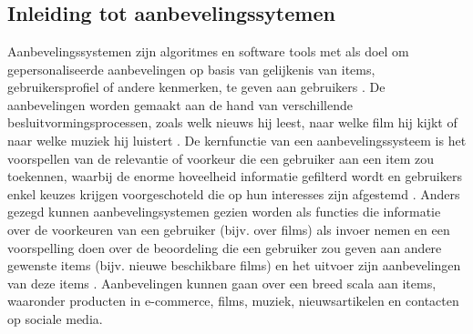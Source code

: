 \chapter{}%
\label{ch:stand-van-zaken}



\section{Inleiding tot aanbevelingssytemen}
Aanbevelingssystemen zijn algoritmes en software tools met als doel om gepersonaliseerde aanbevelingen op basis van gelijkenis van items, gebruikersprofiel of andere kenmerken, te geven aan gebruikers \autocite{Patel2020, Patel2023}. De aanbevelingen worden gemaakt aan de hand van verschillende besluitvormingsprocessen, zoals welk nieuws hij leest, naar welke film hij kijkt of naar welke muziek hij luistert \autocite{Patel2017}. De kernfunctie van een aanbevelingssysteem is het voorspellen van de relevantie of voorkeur die een gebruiker aan een item zou toekennen, waarbij de enorme hoveelheid informatie gefilterd wordt en gebruikers enkel keuzes krijgen voorgeschoteld die op hun interesses zijn afgestemd \autocite{Fkih2022}. Anders gezegd kunnen aanbevelingsystemen gezien worden als functies die informatie over de voorkeuren van een gebruiker (bijv. over films) als invoer nemen en een voorspelling doen over de beoordeling die een gebruiker zou geven aan andere gewenste items (bijv. nieuwe beschikbare films) en het uitvoer zijn aanbevelingen van deze items \autocite{Milano2020}. Aanbevelingen kunnen gaan over een breed scala aan items, waaronder producten in e-commerce, films, muziek, nieuwsartikelen en contacten op sociale media.
